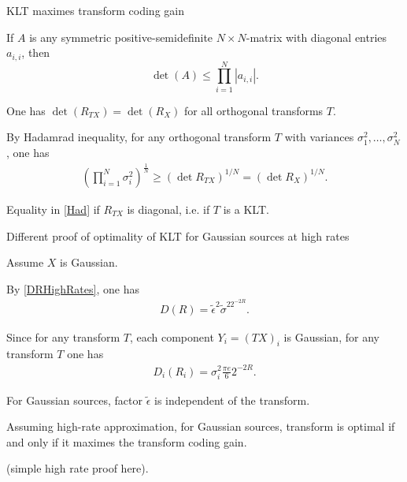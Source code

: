\begin{frame}{KLT maximes transform coding gain}
\bit
\item {} 
 If $A$ is any symmetric positive-semidefinite $N\times N$-matrix with diagonal entries $a_{i,i}$, then 
\[
\det(A)\leq \prod_{i=1}^N|a_{i,i}|. 
\]
\item One has $\det (R_{TX})=\det(R_X)$ for all orthogonal transforms $T$. 

\item By Hadamrad inequality, for any orthogonal transform $T$ with variances $\sigma_1^2,\dots,\sigma_N^2$, one has 
\begin{align}\label{Had}
\left(\prod_{i=1}^N\sigma_i^2\right)^{\frac{1}{N}}\geq (\det R_{TX})^{1/N}=(\det R_X)^{1/N}.
\end{align}
\item Equality in \eqref{Had} if $R_{TX}$ is diagonal, i.e. if $T$ is a KLT. 
\item[\iarrow] 
\eit  
\end{frame}

\begin{frame}{Different proof of optimality of KLT for Gaussian sources at high rates}
\bit
\item Assume $X$ is Gaussian.
\item By \eqref{DRHighRates}, one has 
\begin{align*}
D(R)=\tilde{\epsilon}^2\tilde{\sigma}^22^{-2R}.
\end{align*}
\item Since for any transform $T$, each component $Y_i=(TX)_i$ is Gaussian, for any transform $T$ one has 
\begin{align*}
D_i(R_i)=\sigma_i^2\frac{\pi e}{6}2^{-2R}.
\end{align*}
\item[\iarrow] For Gaussian sources, factor $\tilde{\epsilon}$ is independent of the transform.
\item[\iarrow] Assuming high-rate approximation, for Gaussian sources, transform is optimal if and only if it maximes the transform coding gain.
\item[\iarrow]  (simple high rate proof here).  
\eit
\end{frame}
 
